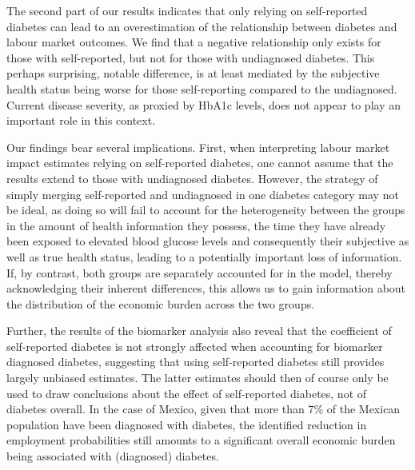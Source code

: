 The second part of our results indicates that only relying on self-reported diabetes can lead to an overestimation of the relationship between diabetes and labour market outcomes. We find that a negative relationship only exists for those with self-reported, but not for those with undiagnosed diabetes. This perhaps surprising, notable difference, is at least mediated by the subjective health status being worse for those self-reporting compared to the undiagnosed. Current disease severity, as proxied by \ac{HbA1c} levels, does not appear to play an important role in this context.

Our findings bear several implications. First, when interpreting labour market impact estimates relying on self-reported diabetes, one cannot assume that the results extend to those with undiagnosed diabetes. However, the strategy of simply merging self-reported and undiagnosed in one diabetes category may not be ideal, as doing so will fail to account for the heterogeneity between the groups in the amount of health information they possess, the time they have already been exposed to elevated blood glucose levels and consequently their subjective as well as true health status, leading to a potentially important loss of information. If, by contrast, both groups are separately accounted for in the model, thereby acknowledging their inherent differences, this allows us to gain information about the distribution of the economic burden across the two groups. 

Further, the results of the biomarker analysis also reveal that the coefficient of self-reported diabetes is not strongly affected when accounting for biomarker diagnosed diabetes, suggesting that using self-reported diabetes  still provides largely unbiased estimates. The latter estimates should then of course only be used to draw conclusions about the effect of self-reported diabetes, not of diabetes overall. In the case of Mexico, given that more than 7\% of the Mexican population have been diagnosed with diabetes, the identified reduction in employment probabilities still amounts to a significant overall economic burden being associated with (diagnosed) diabetes.

